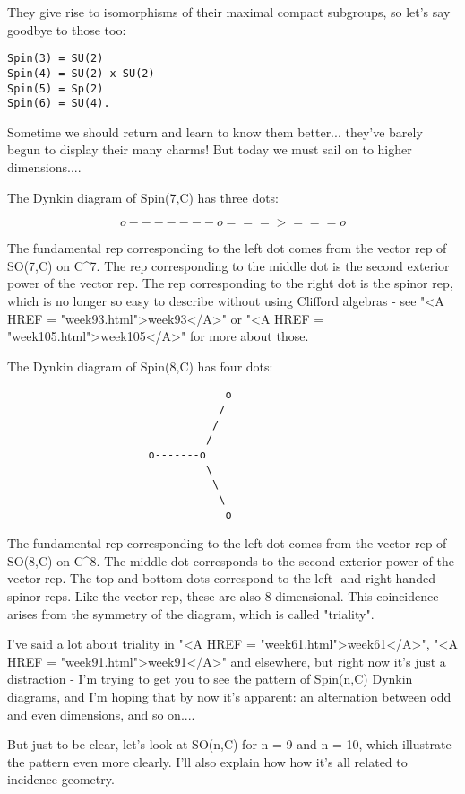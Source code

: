 They give rise to isomorphisms of their maximal compact subgroups, 
so let's say goodbye to those too:

\begin{verbatim}
Spin(3) = SU(2)
Spin(4) = SU(2) x SU(2)
Spin(5) = Sp(2)
Spin(6) = SU(4).
\end{verbatim}
    
Sometime we should return and learn to know them better... they've
barely begun to display their many charms!  But today we must 
sail on to higher dimensions....

The Dynkin diagram of Spin(7,C) has three dots:


$$
                     o-------o===>===o 
$$
    
The fundamental rep corresponding to the left dot comes from
the vector rep of SO(7,C) on C^{7}.  The rep corresponding to the
middle dot is the second exterior power of the vector rep.  The
rep corresponding to the right dot is the spinor rep, which is
no longer so easy to describe without using Clifford algebras -
see "<A HREF = "week93.html">week93</A>" or "<A HREF = "week105.html">week105</A>" for more about those.

The Dynkin diagram of Spin(8,C) has four dots:

\begin{verbatim}
                                  o
                                 /
                                /
                               /
                      o-------o
                               \
                                \
                                 \
                                  o
\end{verbatim}
    
The fundamental rep corresponding to the left dot comes from
the vector rep of SO(8,C) on C^{8}.  The middle dot corresponds
to the second exterior power of the vector rep.  The top and
bottom dots correspond to the left- and right-handed spinor reps.
Like the vector rep, these are also 8-dimensional.  This coincidence
arises from the symmetry of the diagram, which is called "triality".

I've said a lot about triality 
in "<A HREF = "week61.html">week61</A>", 
"<A HREF = "week91.html">week91</A>" and elsewhere,
but right now it's just a distraction - I'm trying to get you to
see the pattern of Spin(n,C) Dynkin diagrams, and I'm hoping that
by now it's apparent: an alternation between odd and even dimensions,
and so on....

But just to be clear, let's look at SO(n,C) for n = 9 and n = 10, which 
illustrate the pattern even more clearly.   I'll also explain how
how it's all related to incidence geometry.

